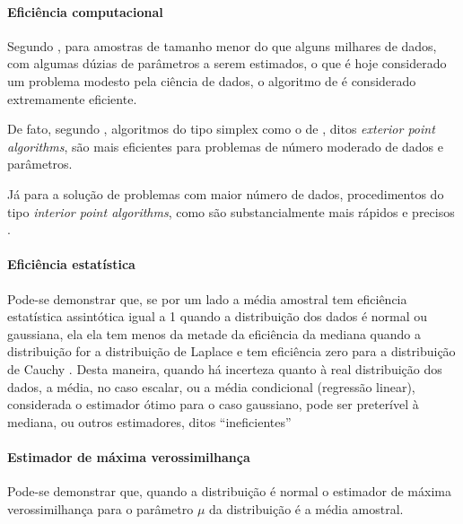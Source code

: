 \documentclass[a4paper, 12pt]{article}
\let\oldparagraph\paragraph
\renewcommand{\paragraph}[1]{\oldparagraph{#1}\mbox{}}
\begin{document}
\hypertarget{eficiencia-computacional}{%
\paragraph{Eficiência computacional}\label{eficiencia-computacional}}

Segundo \textcite[p.~3]{conopt}, para amostras de tamanho menor do que
alguns milhares de dados, com algumas dúzias de parâmetros a serem
estimados, o que é hoje considerado um problema modesto pela ciência de
dados, o algoritmo de \textcite{barrodale} é considerado extremamente
eficiente.

De fato, segundo \textcite[p.~6]{conopt}, algoritmos do tipo simplex
como o de \textcite{barrolade}, ditos \emph{exterior point algorithms},
são mais eficientes para problemas de número moderado de dados e
parâmetros.

Já para a solução de problemas com maior número de dados, procedimentos
do tipo \emph{interior point algorithms}, como são substancialmente mais
rápidos e precisos \autocite[6]{conopt}.

\hypertarget{eficiencia-estatistica}{%
\paragraph{Eficiência estatística}\label{eficiencia-estatistica}}

Pode-se demonstrar que, se por um lado a média amostral tem eficiência
estatística assintótica igual a 1 quando a distribuição dos dados é
normal ou gaussiana, ela ela tem menos da metade da eficiência da
mediana quando a distribuição for a distribuição de Laplace e tem
eficiência zero para a distribuição de Cauchy
\autocite[p.36]{koenker1978}. Desta maneira, quando há incerteza quanto
à real distribuição dos dados, a média, no caso escalar, ou a média
condicional (regressão linear), considerada o estimador ótimo para o
caso gaussiano, pode ser preterível à mediana, ou outros estimadores,
ditos ``ineficientes'' \autocite[p.36]{koenker1978}

\hypertarget{estimador-de-maxima-verossimilhanca}{%
\paragraph{Estimador de máxima
verossimilhança}\label{estimador-de-maxima-verossimilhanca}}

Pode-se demonstrar que, quando a distribuição é normal o estimador de
máxima verossimilhança para o parâmetro \(\mu\) da distribuição é a
média amostral.
\end{document}
